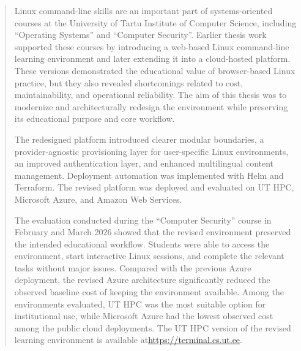 \newpage
{} %

\begin{info}
  \begin{abstract}
    Linux command-line skills are an important part of systems-oriented courses at the University of Tartu Institute of Computer Science, including ``Operating Systems'' and ``Computer Security''.
    Earlier thesis work supported these courses by introducing a web-based Linux command-line learning environment and later extending it into a cloud-hosted platform.
    These versions demonstrated the educational value of browser-based Linux practice, but they also revealed shortcomings related to cost, maintainability, and operational reliability.
    The aim of this thesis was to modernize and architecturally redesign the environment while preserving its educational purpose and core workflow.

    The redesigned platform introduced clearer modular boundaries, a provider-agnostic provisioning layer for user-specific Linux environments, an improved authentication layer, and enhanced multilingual content management.
    Deployment automation was implemented with Helm and Terraform.
    The revised platform was deployed and evaluated on UT HPC, Microsoft Azure, and Amazon Web Services.

    The evaluation conducted during the ``Computer Security'' course in February and March 2026 showed that the revised environment preserved the intended educational workflow.
    Students were able to access the environment, start interactive Linux sessions, and complete the relevant tasks without major issues.
    Compared with the previous Azure deployment, the revised Azure architecture significantly reduced the observed baseline cost of keeping the environment available.
    Among the environments evaluated, UT HPC was the most suitable option for institutional use, while Microsoft Azure had the lowest observed cost among the public cloud deployments.
    The UT HPC version of the revised learning environment is available at\url{https://terminal.cs.ut.ee}.
  \end{abstract}


\end{info}


